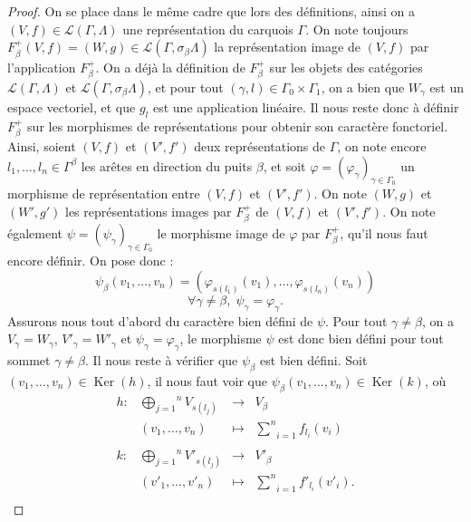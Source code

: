 \documentclass[a4paper,10pt]{article}
\DeclareMathOperator{\Ker}{Ker}
\begin{document}
\begin{proof}
	On se place dans le même cadre que lors des définitions, ainsi on a $(V,f)\in\mathscr{L}(\Gamma,\Lambda)$ une représentation du carquois $\Gamma$. On note toujours $F_{\beta}^{+}(V,f)=(W,g)\in\mathscr{L}(\Gamma,\sigma_{\beta}\Lambda)$ la représentation image de $(V,f)$ par l'application $F_{\beta}^{+}$. On a déjà la définition de $F_{\beta}^{+}$ sur les objets des catégories $\mathscr{L}(\Gamma,\Lambda)$ et $\mathscr{L}(\Gamma,\sigma_{\beta}\Lambda)$, et pour tout $(\gamma,l)\in\Gamma_{0}\times\Gamma_{1}$, on a bien que $W_{\gamma}$ est un espace vectoriel, et que $g_{l}$ est une application linéaire. Il nous reste donc à définir $F_{\beta}^{+}$ sur les morphismes de représentations pour obtenir son caractère fonctoriel. Ainsi, soient $(V,f)$ et $(V',f')$ deux représentations de $\Gamma$, on note encore $l_{1},\dots,l_{n}\in\Gamma^{\beta}$ les arêtes en direction du puits $\beta$, et soit $\varphi=(\varphi_{\gamma})_{\gamma\in\Gamma_{0}}$ un morphisme de représentation entre $(V,f)$ et $(V',f')$. On note $(W,g)$ et $(W',g')$ les représentations images par $F_{\beta}^{+}$ de $(V,f)$ et $(V',f')$. On note également $\psi=(\psi_{\gamma})_{\gamma\in\Gamma_{0}}$ le morphisme image de $\varphi$ par $F_{\beta}^{+}$, qu'il nous faut encore définir. On pose donc :
	\[	
		\psi_{\beta}(v_{1},\dots,v_{n})=(\varphi_{s(l_{1})}(v_{1}),\dots,\varphi_{s(l_{n})}(v_{n}))
	\]
	\[
		\forall \gamma\neq\beta,\; \psi_{\gamma}=\varphi_{\gamma}.
	\]
	Assurons nous tout d'abord du caractère bien défini de $\psi$. Pour tout $\gamma\neq\beta$, on a $V_{\gamma}=W_{\gamma}$, $V'_{\gamma}=W'_{\gamma}$ et $\psi_{\gamma}=\varphi_{\gamma}$, le morphisme $\psi$ est donc bien défini pour tout sommet $\gamma\neq\beta$. Il nous reste à vérifier que $\psi_{\beta}$ est bien défini. Soit $(v_{1},\dots,v_{n})\in\Ker(h)$, il nous faut voir que $\psi_{\beta}(v_{1},\dots,v_{n})\in\Ker(k)$, où
	\[
\begin{array}{lccc}
	h : & \overset{n}{\underset{j=1}{\bigoplus}}V_{s(l_{j})}&\rightarrow & V_{\beta} \\ 
	& (v_{1},\dots,v_{n})&\mapsto & \underset{i=1}{\overset{n}{\sum}}f_{l_{i}}(v_{i})\\
	&&&\\
	k : & \overset{n}{\underset{j=1}{\bigoplus}}V'_{s(l_{j})}&\rightarrow & V'_{\beta} \\ 
	& (v'_{1},\dots,v'_{n})&\mapsto & \underset{i=1}{\overset{n}{\sum}}f'_{l_{i}}(v'_{i}).\\
\end{array}
\]
\end{proof}
\end{document}
